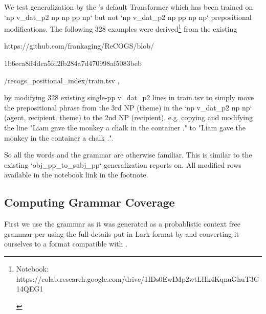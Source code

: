 \documentclass[11pt]{article}
\begin{document}
We test generalization by the \cite{Wu2023}'s default Transformer which has been trained on `np v\_dat\_p2 np np pp np` but not `np v\_dat\_p2 np pp np np` prepositional modifications.
The following 328 examples were derived\footnote{\begin{footnotesize} Notebook: https://colab.research.google.com/drive/1IDs0EwIMp2wtLHk4KqnuGhuT3G14QEG1 \end{footnotesize}} from the existing

https://github.com/frankaging/ReCOGS/blob/

1b6eca8ff4dca5fd2fb284a7d470998af5083beb

/recogs\_positional\_index/train.tsv , 

by modifying 328 existing single-pp v\_dat\_p2 lines in train.tsv to simply move the prepositional phrase from the 3rd NP (theme) in the `np v\_dat\_p2 np np` (agent, recipient, theme) to the 2nd NP (recipient), e.g. copying and modifying the line "Liam gave the monkey a chalk in the container ." to "Liam gave the monkey in the container a chalk .".

So all the words and the grammar are otherwise familiar. This is similar to the existing `obj\_pp\_to\_subj\_pp` generalization \cite{Wu2023} reports on.
All modified rows available in the notebook link in the footnote.

\clearpage

\subsection{Computing Grammar Coverage}
\label{computing_grammar_coverage}

First we use the grammar as it was generated as a probablistic context free grammar per \cite{KimLinzen2020}
using the full details put in Lark format by \cite{klinger2024compositionalprogramgenerationfewshot}
and converting it ourselves to a format compatible with \cite{fuzzingbook2023:GrammarCoverageFuzzer}.
\end{document}
